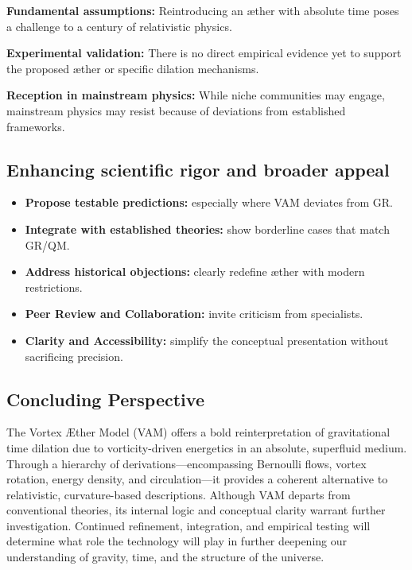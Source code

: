 \textbf{Fundamental assumptions:} Reintroducing an æther with absolute time poses a challenge to a century of relativistic physics.

\textbf{Experimental validation:} There is no direct empirical evidence yet to support the proposed æther or specific dilation mechanisms.

\textbf{Reception in mainstream physics:} While niche communities may engage, mainstream physics may resist because of deviations from established frameworks.

\subsection{Enhancing scientific rigor and broader appeal}

\begin{itemize}
    \item \textbf{Propose testable predictions:} especially where VAM deviates from GR.
    \item \textbf{Integrate with established theories:} show borderline cases that match GR/QM. \item \textbf{Address historical objections:} clearly redefine æther with modern restrictions.
    \item \textbf{Peer Review and Collaboration:} invite criticism from specialists.
    \item \textbf{Clarity and Accessibility:} simplify the conceptual presentation without sacrificing precision.
\end{itemize}

\subsection{Concluding Perspective}

The Vortex Æther Model (VAM) offers a bold reinterpretation of gravitational time dilation due to vorticity-driven energetics in an absolute, superfluid medium. Through a hierarchy of derivations—encompassing Bernoulli flows, vortex rotation, energy density, and circulation—it provides a coherent alternative to relativistic, curvature-based descriptions. Although VAM departs from conventional theories, its internal logic and conceptual clarity warrant further investigation. Continued refinement, integration, and empirical testing will determine what role the technology will play in further deepening our understanding of gravity, time, and the structure of the universe.